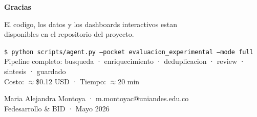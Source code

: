 \documentclass[aspectratio=169,10pt]{beamer}
\newenvironment{card}[1][cardbg]{%
  \begin{tcolorbox}[colback=#1,colframe=bidlight!40,arc=4pt,
    boxrule=0.4pt,left=5pt,right=5pt,top=4pt,bottom=4pt]}%
  {\end{tcolorbox}}
\begin{document}
{
\begin{frame}[plain]
\vspace{14mm}\hspace{7mm}%
\begin{minipage}{0.76\textwidth}
{\Large\bfseries\color{white}Gracias}
\vspace{6mm}

\textcolor{bidgray}{\small
El codigo, los datos y los dashboards interactivos estan\\disponibles en el repositorio del proyecto.}

\vspace{8mm}
\begin{card}
\scriptsize\color{bidgray}
\texttt{\$ python scripts/agent.py --pocket evaluacion\_experimental --mode full}\\[3pt]
\textcolor{bidaccent!70}{Pipeline completo: busqueda · enriquecimiento · deduplicacion · review · sintesis · guardado}\\
\textcolor{bidaccent!70}{Costo: $\approx$\$0.12 USD · Tiempo: $\approx$20 min}
\end{card}

\vspace{6mm}
\textcolor{bidgray!50}{\footnotesize
  Maria Alejandra Montoya · m.montoyac@uniandes.edu.co\\
  Fedesarrollo \& BID · Mayo 2026}
\end{minipage}
\end{frame}
}
\end{document}
